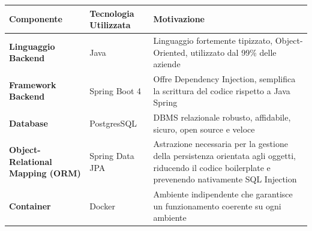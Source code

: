 \begin{longtable}{|p{4cm}|p{4cm}|p{7cm}|}
    \hline
    \textbf{Componente} & \textbf{Tecnologia Utilizzata} & \textbf{Motivazione} \\
    \hline
    \textbf{Linguaggio Backend}              & Java                                   & Linguaggio fortemente tipizzato, Object-Oriented, utilizzato dal 99\% delle aziende \cite{java-adoption-rate}   \\
    \hline
    \textbf{Framework Backend}               & Spring Boot 4                          & Offre Dependency Injection, semplifica la scrittura del codice rispetto a Java Spring \\
    \hline
    \textbf{Database}                        & PostgresSQL                            & DBMS relazionale robusto, affidabile, sicuro, open source e veloce \\
    \hline
    \textbf{Object-Relational Mapping (ORM)} & Spring Data JPA & Astrazione necessaria per la gestione della persistenza orientata agli oggetti, riducendo il codice boilerplate e prevenendo nativamente SQL Injection                                                                                   \\
    \hline
    \textbf{Container}                       & Docker                                 & Ambiente indipendente che garantisce un funzionamento coerente su ogni ambiente                                                                  \\
    \hline
\end{longtable}